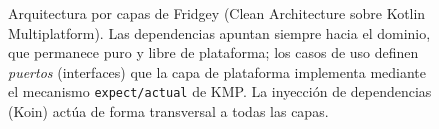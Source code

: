 \begin{figure}[htbp]
  \caption[Arquitectura por capas de Fridgey]{Arquitectura por capas de Fridgey (Clean Architecture sobre Kotlin
  Multiplatform). Las dependencias apuntan siempre hacia el dominio, que permanece puro y libre de plataforma;
  los casos de uso definen \emph{puertos} (interfaces) que la capa de plataforma implementa mediante el mecanismo
  \texttt{expect/actual} de KMP. La inyección de dependencias (Koin) actúa de forma transversal a todas las capas.}
  \label{fig:arquitectura-capas}
\end{figure}

